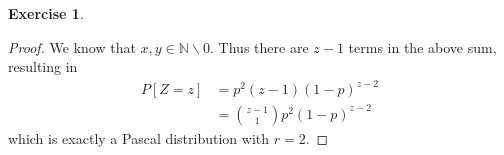 \documentclass[12pt,a4paper]{article}
\theoremstyle{definition}
\newtheorem{exercise}{Exercise}
\begin{document}
\begin{exercise}
\begin{enumerate}[label=\roman*)]
\begin{proof}
        We know that $x,y\in \mathbb{N} \backslash {0}$. Thus there are $z-1$ terms in the above sum, resulting in
        \begin{equation*}
            \begin{split}
                P[Z=z]&=p^2(z-1)(1-p)^{z-2}\\
                &=\binom{z-1}{1}p^2(1-p)^{z-2} 
            \end{split}
        \end{equation*}
        which is exactly a Pascal distribution with $r=2$.
    \end{proof}
\end{enumerate}
\end{exercise}
\end{document}
